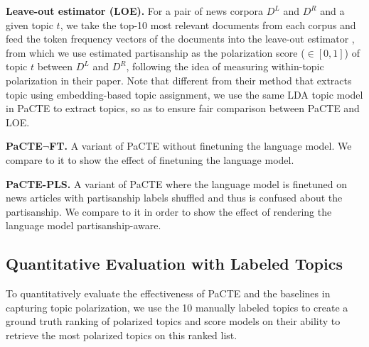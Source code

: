 \documentclass[11pt]{article}
\begin{document}
\textbf{Leave-out estimator (LOE).} For a pair of news corpora $D^L$ and $D^R$ and a given topic $t$, we take the top-10 most relevant documents from each corpus and feed the token frequency vectors of the documents into the leave-out estimator \cite{demszky2019analyzing}, from which we use estimated partisanship as the polarization score ($\in [0, 1]$) of topic $t$ between $D^L$ and $D^R$, following the idea of measuring within-topic polarization in their paper. Note that different from their method that extracts topic using embedding-based topic assignment, we use the same LDA topic model in PaCTE to extract topics, so as to ensure fair comparison between PaCTE and LOE.

\textbf{PaCTE$\neg$FT.} A variant of PaCTE without finetuning the language model. We compare to it to show the effect of finetuning the language model.

\textbf{PaCTE-PLS.} A variant of PaCTE where the language model is finetuned on news articles with partisanship labels shuffled and thus is confused about the partisanship. We compare to it in order to show the effect of rendering the language model partisanship-aware.



\subsection{Quantitative Evaluation with Labeled Topics}
\label{sec:evaluation}
To quantitatively evaluate the effectiveness of PaCTE and the baselines in capturing topic polarization, we use the 10 manually labeled topics to create a ground truth ranking of polarized topics and score models on their ability to retrieve the most polarized topics on this ranked list. %
\end{document}
